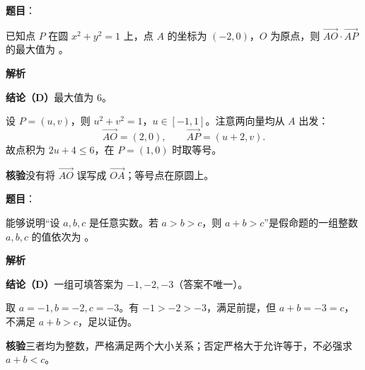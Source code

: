 \begin{answer}

\textbf{题目}：

已知点 $P$ 在圆 $x^2+y^2=1$ 上，点 $A$ 的坐标为 $(-2,0)$，$O$ 为原点，则 $\overrightarrow{AO}\cdot\overrightarrow{AP}$ 的最大值为 \gkblank{}。

\textbf{解析}

\textbf{结论（D）}最大值为 $6$。

设 $P=(u,v)$，则 $u^2+v^2=1$，$u\in[-1,1]$。注意两向量均从 $A$ 出发：
\nopagebreak[4]
\[
\overrightarrow{AO}=(2,0),\qquad
\overrightarrow{AP}=(u+2,v).
\]
故点积为 $2u+4\leqslant6$，在 $P=(1,0)$ 时取等号。

\textbf{核验}没有将 $\overrightarrow{AO}$ 误写成 $\overrightarrow{OA}$；等号点在原圆上。


\end{answer}
\begin{answer}

\textbf{题目}：

能够说明“设 $a,b,c$ 是任意实数。若 $a>b>c$，则 $a+b>c$”是假命题的一组整数 $a,b,c$ 的值依次为 \gkblank{}。

\textbf{解析}

\textbf{结论（D）}一组可填答案为 $-1,-2,-3$（答案不唯一）。

取 $a=-1,b=-2,c=-3$。有 $-1>-2>-3$，满足前提，但 $a+b=-3=c$，不满足 $a+b>c$，足以证伪。

\textbf{核验}三者均为整数，严格满足两个大小关系；否定严格大于允许等于，不必强求 $a+b<c$。


\end{answer}

